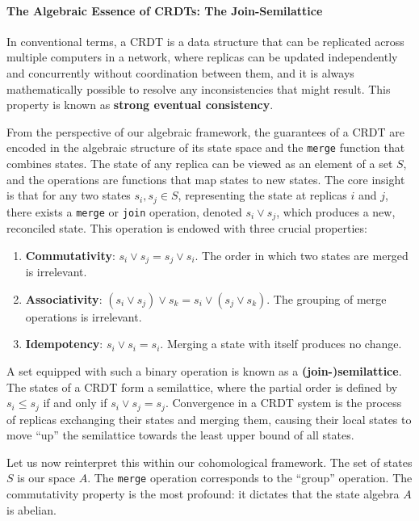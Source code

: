 \documentclass[
]{article}
\providecommand{\tightlist}{%
  \setlength{\itemsep}{0pt}\setlength{\parskip}{0pt}}
\begin{document}
\paragraph{The Algebraic Essence of CRDTs: The
Join-Semilattice}\label{the-algebraic-essence-of-crdts-the-join-semilattice}

In conventional terms, a CRDT is a data structure that can be replicated
across multiple computers in a network, where replicas can be updated
independently and concurrently without coordination between them, and it
is always mathematically possible to resolve any inconsistencies that
might result. This property is known as \textbf{strong eventual
consistency}.

From the perspective of our algebraic framework, the guarantees of a
CRDT are encoded in the algebraic structure of its state space and the
\texttt{merge} function that combines states. The state of any replica
can be viewed as an element of a set \(S\), and the operations are
functions that map states to new states. The core insight is that for
any two states \(s_i, s_j \in S\), representing the state at replicas
\(i\) and \(j\), there exists a \texttt{merge} or \texttt{join}
operation, denoted \(s_i \lor s_j\), which produces a new, reconciled
state. This operation is endowed with three crucial properties:

\begin{enumerate}
\def\labelenumi{\arabic{enumi}.}
\tightlist
\item
  \textbf{Commutativity}: \(s_i \lor s_j = s_j \lor s_i\). The order in
  which two states are merged is irrelevant.
\item
  \textbf{Associativity}:
  \((s_i \lor s_j) \lor s_k = s_i \lor (s_j \lor s_k)\). The grouping of
  merge operations is irrelevant.
\item
  \textbf{Idempotency}: \(s_i \lor s_i = s_i\). Merging a state with
  itself produces no change.
\end{enumerate}

A set equipped with such a binary operation is known as a
\textbf{(join-)semilattice}. The states of a CRDT form a semilattice,
where the partial order is defined by \(s_i \le s_j\) if and only if
\(s_i \lor s_j = s_j\). Convergence in a CRDT system is the process of
replicas exchanging their states and merging them, causing their local
states to move ``up'' the semilattice towards the least upper bound of
all states.

Let us now reinterpret this within our cohomological framework. The set
of states \(S\) is our space \(A\). The \texttt{merge} operation
corresponds to the ``group'' operation. The commutativity property is
the most profound: it dictates that the state algebra \(A\) is abelian.
\end{document}
